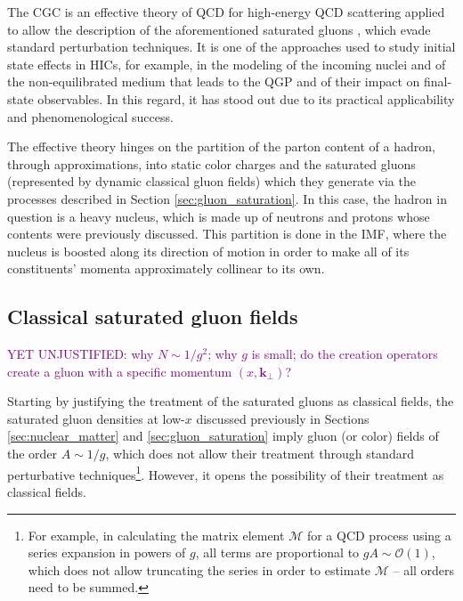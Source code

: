 
The \gls{CGC} is an effective theory of \gls{QCD} for high-energy \gls{QCD} scattering applied to allow the description of the aforementioned saturated gluons \cite{Gelis:2010nm}, which evade standard perturbation techniques. It is one of the approaches used to study initial state effects in \glspl{HIC}, for example, in the modeling of the incoming nuclei and of the non-equilibrated medium that leads to the \gls{QGP} and of their impact on final-state observables. In this regard, it has stood out due to its practical applicability and phenomenological success.\cite{Albacete:2014fwa}

The effective theory hinges on the partition of the parton content of a hadron,
through approximations, into static color charges and the saturated gluons (represented by dynamic classical gluon fields) which they generate via the processes described in Section \ref{sec:gluon_saturation}.\cite{Gelis:2010nm} In this case, the hadron in question is a heavy nucleus, which is made up of neutrons and protons whose contents were previously discussed. This partition is done in the \gls{IMF}, where the nucleus is boosted along its direction of motion in order to make all of its constituents' momenta approximately collinear to its own.


\subsection{Classical saturated gluon fields}
\textcolor{purple}{YET UNJUSTIFIED: why $N \sim 1/g^2$; why $g$ is small; do the creation operators create a gluon with a specific momentum $(x,\mathbf{k}_\perp)$?}

Starting by justifying the treatment of the saturated gluons as classical fields, the saturated gluon densities at low-$x$ discussed previously in Sections \ref{sec:nuclear_matter} and \ref{sec:gluon_saturation} imply gluon (or color) fields of the order $A \sim 1/g$, which does not allow their treatment through standard perturbative techniques\footnote{For example, in calculating the matrix element $\mathcal{M}$ for a \gls{QCD} process using a series expansion in powers of $g$, all terms are proportional to $gA \sim \mathcal{O}(1)$, which does not allow truncating the series in order to estimate $\mathcal{M}$ -- all orders need to be summed.}.\cite{Albacete:2014fwa} However, it opens the possibility of their treatment as classical fields.

